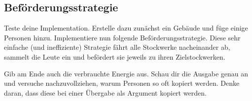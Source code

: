 
\subsection{Beförderungsstrategie}
Teste deine Implementation.
Erstelle dazu zunächst ein Gebäude und füge einige Personen hinzu.
%
%
Implementiere nun folgende Beförderungsstrategie.
Diese sehr einfache (und ineffiziente) Strategie fährt alle Stockwerke nacheinander ab, sammelt die Leute ein und befördert sie jeweils zu ihren Zielstockwerken.
%
\begin{algorithm}[H]
 \SetAlgoLined
\end{algorithm}
%
\noindent Gib am Ende auch die verbrauchte Energie aus.
Schau dir die Ausgabe genau an und versuche nachzuvollziehen, warum Personen so oft kopiert werden.
Denke daran, dass diese bei einer Übergabe als Argument kopiert werden.

